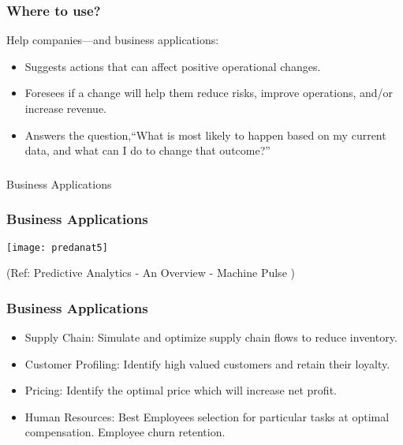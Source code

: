 \begin{frame}\frametitle{Where to use?}
Help companies—and business applications:
\begin{itemize}
\item Suggests actions that can affect positive operational changes.
\item Foresees if a change will help them reduce risks, improve operations, and/or increase revenue.
\item Answers the question,``What is most likely to happen based on my current data, and what can I do to change that outcome?''
\end{itemize}
\end{frame}

\begin{frame}[fragile]\frametitle{}
\begin{center}
{\Large Business Applications}
\end{center}
\end{frame}


\begin{frame}\frametitle{Business Applications}

\begin{center}
\texttt{[image: predanat5]}
\end{center}

{\tiny (Ref: Predictive Analytics - An Overview - Machine Pulse )}

\end{frame}

\begin{frame}\frametitle{Business Applications}
\begin{itemize}
\item Supply Chain:
Simulate and optimize supply chain flows to reduce inventory.
\item  Customer Profiling:
Identify high valued customers and retain their loyalty.
\item  Pricing:
Identify the optimal price which will increase net profit.
\item Human Resources:
Best Employees selection for particular tasks at optimal
compensation. Employee churn retention.

\end{itemize}
\end{frame}

